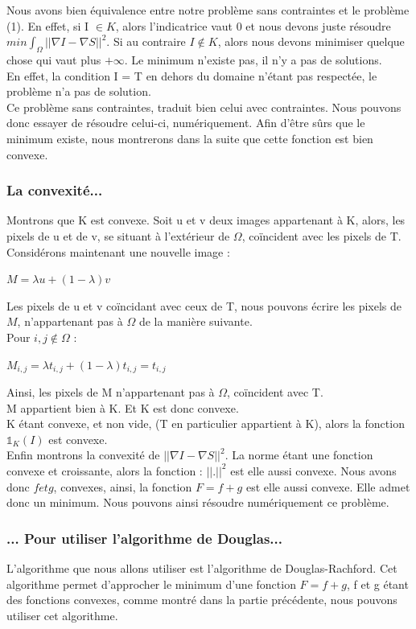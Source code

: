 Nous avons bien équivalence entre notre problème sans contraintes et le problème (1). En effet, si I $\in K$, alors l'indicatrice vaut 0 et nous devons juste résoudre $min \int_\Omega ||\nabla I - \nabla S||^2 $. Si au contraire $I \notin K$, alors nous devons minimiser quelque chose qui vaut plus $+\infty$. Le minimum n'existe pas, il n'y a pas de solutions.\\
 En effet, la condition I = T en dehors du domaine n'étant pas respectée, le problème n'a pas de solution. \\
 Ce problème sans contraintes, traduit bien celui avec contraintes. Nous pouvons donc essayer de résoudre celui-ci, numériquement. Afin d'être sûrs que le minimum existe, nous montrerons dans la suite que cette fonction est bien convexe. 
\subsubsection{La convexité...}
Montrons que K est convexe. 
Soit u et v deux images appartenant à K, alors, les pixels de u et de v, se situant à l'extérieur de $\Omega$, coïncident avec les pixels de T. \\
Considérons maintenant une nouvelle image : 
\begin{center}
$M = \lambda u+(1-\lambda)v$
\end{center}
Les pixels de u et v coïncidant avec ceux de T, nous pouvons écrire les pixels de $M$, n'appartenant pas à $\Omega$ de la manière suivante. \\
Pour $i,j \notin \Omega$ : \\
\begin{center}
$M_{i,j} = \lambda t_{i,j}+(1-\lambda) t_{i,j} = t_{i,j}$
\end{center}
Ainsi, les pixels de M n'appartenant pas à $\Omega$, coïncident avec T. \\
M appartient bien à K. Et K est donc convexe.\\
K étant convexe, et non vide, (T en particulier appartient à K), alors la fonction $\mathbb{1}_K(I)$ est convexe. \\
Enfin montrons la convexité de $||\nabla I-\nabla S||^2$.
La norme étant une fonction convexe et croissante, alors la fonction : $||.||^2$ est elle aussi convexe. 
Nous avons donc $f et g$, convexes, ainsi, la fonction $F =f+g$ est elle aussi convexe. Elle admet donc un minimum. Nous pouvons ainsi résoudre numériquement ce problème.
\subsubsection{... Pour utiliser l'algorithme de Douglas...}
L'algorithme que nous allons utiliser est l'algorithme de Douglas-Rachford. Cet algorithme permet d'approcher le minimum  d'une fonction $F = f+g$, f et g étant des fonctions convexes, comme montré dans la partie précédente, nous pouvons utiliser cet algorithme.
